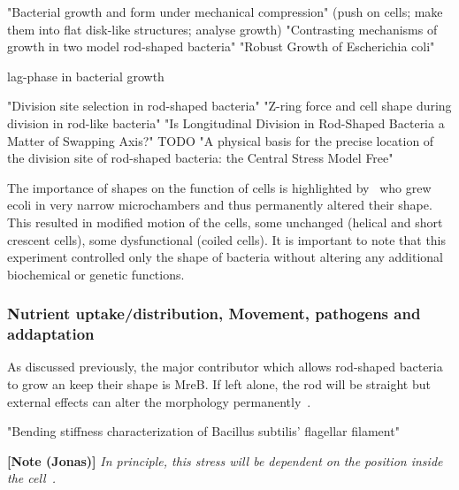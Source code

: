 \documentclass{article}
\begin{document}
\cite{Si2015} "Bacterial growth and form under mechanical compression" (push on cells; make them into flat disk-like structures; analyse growth)
\cite{Billaudeau2017} "Contrasting mechanisms of growth in two model rod-shaped bacteria"
\cite{Wang2010_2} "Robust Growth of Escherichia coli"

\cite{Bertrand2019} lag-phase in bacterial growth

\cite{Bramkamp2009} "Division site selection in rod-shaped bacteria"
\cite{Lan2007} "Z-ring force and cell shape during division in rod-like bacteria"
\cite{denBlaauwen2018} "Is Longitudinal Division in Rod-Shaped Bacteria a Matter of Swapping Axis?"
\cite{Koch1995} TODO "A physical basis for the precise location of the division site of rod-shaped bacteria: the Central Stress Model Free"


The importance of shapes on the function of cells is highlighted by~\cite{Takeuchi2005} who grew
\ac{ecoli} in very narrow microchambers and thus permanently altered their shape.
This resulted in modified motion of the cells, some unchanged (helical and short crescent cells),
some dysfunctional (coiled cells).
It is important to note that this experiment controlled only the shape of bacteria without altering
any additional biochemical or genetic functions.

\subsubsection{Nutrient uptake/distribution, Movement, pathogens and addaptation} %

As discussed previously, the major contributor which allows rod-shaped bacteria to grow an keep their shape is MreB.
If left alone, the rod will be straight but external effects can alter the morphology permanently~\cite{Takeuchi2005}.

\cite{Shen2022} "Bending stiffness characterization of Bacillus subtilis’ flagellar filament"

\textbf{[Note (Jonas)]} \textit{In principle, this stress will be dependent on the position inside the cell~\cite{Chatterjee1988}.}
\end{document}
